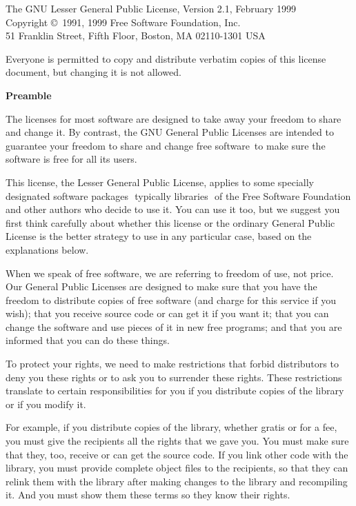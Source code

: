 {\small
{\raggedright The GNU Lesser General Public License, Version 2.1, February 1999 \\
Copyright \copyright\ 1991, 1999 Free Software Foundation, Inc.\\
51 Franklin Street, Fifth Floor, Boston, MA  02110-1301  USA}

\noindent Everyone is permitted to copy and distribute verbatim copies
of this license document, but changing it is not allowed.

{\medskip\noindent\normalsize\textbf{Preamble}\smallskip}

\noindent The licenses for most software are designed to take away your freedom 
to share and change it. By contrast, the GNU General Public Licenses are 
intended to guarantee your freedom to share and change free software\,\textemdash{}
to make sure the software is free for all its users.

This license, the Lesser General Public License, applies to some specially 
designated software packages\,\textemdash\ typically libraries\,\textemdash\ of the 
Free Software Foundation and other authors who decide to use it. You can use it 
too, but we suggest you first think carefully about whether this license or the 
ordinary General Public License is the better strategy to use in any particular 
case, based on the explanations below.

When we speak of free software, we are referring to freedom of use, not price. 
Our General Public Licenses are designed to make sure that you have the freedom 
to distribute copies of free software (and charge for this service if you wish); 
that you receive source code or can get it if you want it; that you can change 
the software and use pieces of it in new free programs; and that you are 
informed that you can do these things.

To protect your rights, we need to make restrictions that forbid distributors to 
deny you these rights or to ask you to surrender these rights. These 
restrictions translate to certain responsibilities for you if you distribute 
copies of the library or if you modify it.

For example, if you distribute copies of the library, whether gratis or for a 
fee, you must give the recipients all the rights that we gave you. You must make 
sure that they, too, receive or can get the source code. If you link other code 
with the library, you must provide complete object files to the recipients, so 
that they can relink them with the library after making changes to the library 
and recompiling it. And you must show them these terms so they know their 
rights.

}
